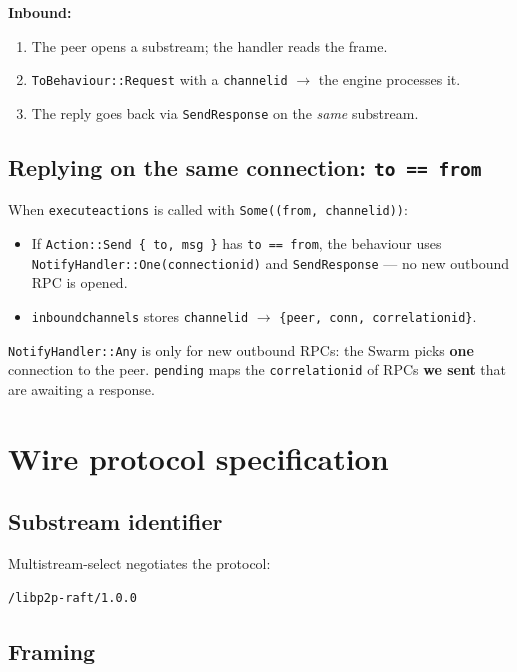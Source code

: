 \documentclass[11pt,a4paper]{article}
\newcommand{\code}[1]{{\def\_{\textunderscore\allowbreak}\texttt{#1}}}
\begin{document}
\textbf{Inbound:}
\begin{enumerate}[label=\arabic*., nosep]
  \item The peer opens a substream; the handler reads the frame.
  \item \code{ToBehaviour::Request} with a \code{channel\_id} $\rightarrow$ the engine processes it.
  \item The reply goes back via \code{SendResponse} on the \emph{same} substream.
\end{enumerate}

\subsection{Replying on the same connection: \code{to == from}}

When \code{execute\_actions} is called with \code{Some((from, channel\_id))}:
\begin{itemize}[nosep]
  \item If \code{Action::Send \{ to, msg \}} has \code{to == from}, the behaviour uses
    \code{NotifyHandler::One(connection\_id)} and \code{SendResponse} --- no new outbound RPC is opened.
  \item \code{inbound\_channels} stores \code{channel\_id} $\rightarrow$ \code{\{peer, conn, correlation\_id\}}.
\end{itemize}

\code{NotifyHandler::Any} is only for new outbound RPCs: the Swarm picks \textbf{one} connection
to the peer. \code{pending} maps the \code{correlation\_id} of RPCs \textbf{we sent} that are
awaiting a response.

\section{Wire protocol specification}

\subsection{Substream identifier}

Multistream-select negotiates the protocol:
\begin{lstlisting}
/libp2p-raft/1.0.0
\end{lstlisting}

\subsection{Framing}
\end{document}
